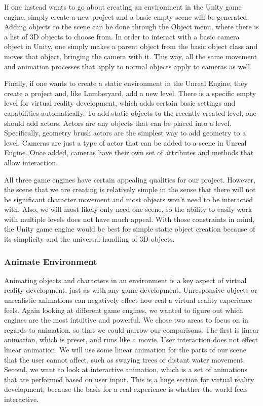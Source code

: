 \documentclass[10pt,journal,compsoc,onecolumn, draftclsnofoot]{IEEEtran}
\begin{document}
If one instead wants to go about creating an environment in the Unity game engine, simply create a new project and a basic empty scene will be generated.
Adding objects to the scene can be done through the Object menu, where there is a list of 3D objects to choose from. \cite{unity_getting_started}
In order to interact with a basic camera object in Unity, one simply makes a parent object from the basic object class and moves that object, bringing the camera with it.
This way, all the same movement and animation processes that apply to normal objects apply to cameras as well. \cite{unity_getting_started}

Finally, if one wants to create a static environment in the Unreal Engine, they create a project and, like Lumberyard, add a new level.
There is a specific empty level for virtual reality development, which adds certain basic settings and capabilities automatically. \cite{unreal_editor_manual}
To add static objects to the recently created level, one should add actors.  Actors are any objects that can be placed into a level.
Specifically, geometry brush actors are the simplest way to add geometry to a level. \cite{unreal_editor_manual}
Cameras are just a type of actor that can be added to a scene in Unreal Engine.  Once added, cameras have their own set of attributes and methods that allow interaction.

All three game engines have certain appealing qualities for our project.
However, the scene that we are creating is relatively simple in the sense that there will not be significant character movement and most objects won't need to be interacted with.
Also, we will most likely only need one scene, so the ability to easily work with multiple levels does not have much appeal.
With those constraints in mind, the Unity game engine would be best for simple static object creation because of its simplicity and the universal handling of 3D objects.

\subsubsection{Animate Environment}

Animating objects and characters in an environment is a key aspect of virtual reality development, just as with any game development.
Unresponsive objects or unrealistic animations can negatively effect how real a virtual reality experience feels.
Again looking at different game engines, we wanted to figure out which engines are the most intuitive and powerful.
We chose two areas to focus on in regards to animation, so that we could narrow our comparisons.
The first is linear animation, which is preset, and runs like a movie. User interaction does not effect linear animation.
We will use some linear animation for the parts of our scene that the user cannot affect, such as swaying trees or distant water movement.
Second, we want to look at interactive animation, which is a set of animations that are performed based on user input.
This is a huge section for virtual reality development, because the basis for a real experience is whether the world feels interactive.
\end{document}
